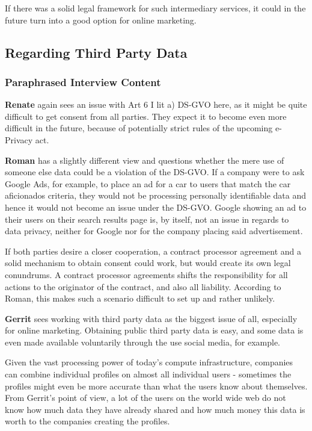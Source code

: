 If there was a solid legal framework for such intermediary services, it could in the future turn into a good option for online marketing.

\subsection{Regarding Third Party Data}

\subsubsection{Paraphrased Interview Content}

\textbf{Renate} again sees an issue with Art 6 I lit a) DS-GVO here, as it might be quite difficult to get consent from all parties. They expect it to become even more difficult in the future, because of potentially strict rules of the upcoming e-Privacy act.

\textbf{Roman} has a slightly different view and questions whether the mere use of someone else data could be a violation of the DS-GVO. If a company were to ask Google Ads, for example, to place an ad for a car to users that match the car aficionados criteria, they would not be processing personally identifiable data and hence it would not become an issue under the DS-GVO. Google showing an ad to their users on their search results page is, by itself, not an issue in regards to data privacy, neither for Google nor for the company placing said advertisement.

If both parties desire a closer cooperation, a contract processor agreement and a solid mechanism to obtain consent could work, but would create its own legal conundrums. A contract processor agreements shifts the responsibility for all actions to the originator of the contract, and also all liability. According to Roman, this makes such a scenario difficult to set up and rather unlikely.

\textbf{Gerrit} sees working with third party data as the biggest issue of all, especially for online marketing. Obtaining public third party data is easy, and some data is even made available voluntarily through the use social media, for example.

Given the vast processing power of today's compute infrastructure, companies can combine individual profiles on almost all individual users - sometimes the profiles might even be more accurate than what the users know about themselves. From Gerrit's point of view, a lot of the users on the world wide web do not know how much data they have already shared and how much money this data is worth to the companies creating the profiles.

